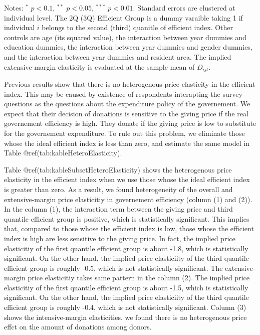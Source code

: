 \documentclass[
]{article}
\begin{document}
\begin{table}
\begin{threeparttable}
\begin{tablenotes}
\item Notes: $^{*}$ $p < 0.1$, $^{**}$ $p < 0.05$, $^{***}$ $p < 0.01$. Standard errors are clustered at individual level. The 2Q (3Q) Efficient Group is a dummy varaible taking 1 if individual $i$ belongs to the second (third) quanitle of efficient index. Other controls are age (its squared value), the interaction between year dummies and education dummies, the interaction between year dummies and gender dummies, and the interaction between year dummies and resident area. The implied extensive-margin elasticity is evaluated at the sample mean of $D_{ijt}$.
\end{tablenotes}
\end{threeparttable}
\end{table}

Previous results show that there is no heterogenous price elasticity in the efficient index.
This may be caused by existence of respondents
interapting the survey questions as the questions about the expenditure policy of the governement.
We expect that their decision of donations is sensitive to the giving price
if the real governement efficiency is high.
They donate if the giving price is low to substitute for the governement expenditure.
To rule out this problem, we eliminate those whose the ideal efficient index is less than zero,
and estimate the same model in Table @ref(tab:kableHeteroElasticity).

Table @ref(tab:kableSubsetHeteroElasticity) shows the heterogenous price elasticity in the efficient index
when we use those whose the ideal efficient index is greater than zero.
As a result, we found heterogeneity of the overall and extensive-margin price elasticitiy
in governement efficiency (column (1) and (2)).
In the column (1), the interaction term between the giving price and third quantile efficient group
is positive, which is statistically significant.
This implies that, compared to those whose the efficient index is low,
those whose the efficient index is high are less sensitive to the giving price.
In fact, the implied price elasticitiy of the first quantile efficient group is about -1.8,
which is statistically significant.
On the other hand, the implied price elasticiity of the third quantile efficient group is roughly -0.5,
which is not statistically significant.
The extensive-margin price elasticitiy takes same pattern in the column (2).
The implied price elasticitiy of the first quantile efficient group is about -1.5,
which is statistically significant.
On the other hand, the implied price elasticiity of the third quantile efficient group is roughly -0.4,
which is not statistically significant.
Column (3) shows the intensive-margin elasticities.
we found there is no heterogenous price effct on the amount of donations among donors.
\end{document}
